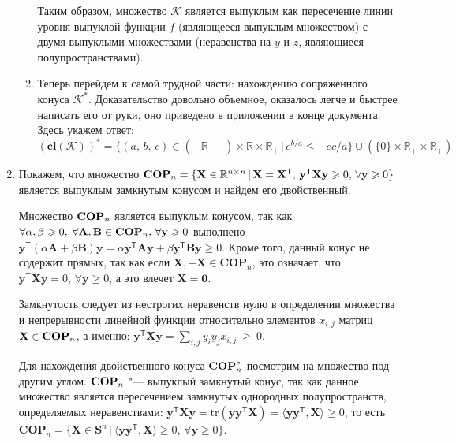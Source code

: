 \documentclass[a4paper,12pt]{article}
\begin{document}
\begin{enumerate}
\begin{enumerate}
			Таким образом, множество $\mathcal{K}$ является выпуклым как пересечение линии уровня выпуклой функции $f$ (являющееся выпуклым множеством) с двумя выпуклыми множествами (неравенства на $y$ и $z$, являющиеся полупространствами).
			
			\item
			
			Теперь перейдем к самой трудной части: нахождению сопряженного конуса $\mathcal{K}^*$. Доказательство довольно объемное, оказалось легче и быстрее написать его от руки, оно приведено в приложении в конце документа. Здесь укажем ответ:
			\begin{equation*}
				(\textbf{cl}(\mathcal{K}))^* = \{ (a,\,b,\,c) \in (-\mathbb{R}_{++}) \times \mathbb{R} \times \mathbb{R}_+ \,|\, e^{b/a} \leqslant -ec/a\} \cup (\{0\} \times \mathbb{R}_+ \times \mathbb{R}_+)
			\end{equation*}
			
		\end{enumerate}
		
		
		
		\item Покажем, что множество $\text{\textbf{COP}}_n = \{ \mathbf{X} \in \mathbb{R}^{n\times n} \,|\, \mathbf{X} = \mathbf{X}^\mathsf{T},\, \mathbf{y}^\mathsf{T} \mathbf{X}\mathbf{y} \geqslant 0,\, \forall \mathbf{y} \geqslant 0\}$ является выпуклым замкнутым конусом и найдем его двойственный.
		
		Множество $\text{\textbf{COP}}_n$ является выпуклым конусом, так как $\forall \alpha, \beta \geqslant 0,\; \forall \mathbf{A}, \mathbf{B} \in \text{\textbf{COP}}_n,\, \forall \mathbf{y} \geqslant 0$ выполнено $ \mathbf{y}^\mathsf{T} (\alpha \mathbf{A} + \beta \mathbf{B}) \mathbf{y} = \alpha \mathbf{y}^\mathsf{T} \mathbf{A}\mathbf{y} + \beta \mathbf{y}^\mathsf{T} \mathbf{B}\mathbf{y} \geqslant 0$. Кроме того, данный конус не содержит прямых, так как если $\mathbf{X}, -\mathbf{X}\in \textbf{COP}_n $, это означает, что $\mathbf{y}^\mathsf{T} \mathbf{X}\mathbf{y} = 0,\, \forall \mathbf{y} \geqslant 0$, а это влечет $\mathbf{X} = \mathbf{0}$.
		
		 Замкнутость следует из нестрогих неравенств нулю в определении множества и непрерывности линейной функции относительно элементов $ x_{i,j}$ матриц $\mathbf{X} \in \text{\textbf{COP}}_n$, а именно: $\mathbf{y}^\mathsf{T} \mathbf{X}\mathbf{y} = \sum_{i,j} y_i y_j x_{i, j}~\geqslant~0$. 
		 
		 Для нахождения двойственного конуса $\text{\textbf{COP}}_n^*$ посмотрим на множество под другим углом. $\text{\textbf{COP}}_n$  "--- выпуклый замкнутый конус, так как данное множество является пересечением замкнутых однородных полупространств, определяемых неравенствами: $\mathbf{y}^\mathsf{T} \mathbf{X}\mathbf{y} = \text{tr}(\mathbf{y} \mathbf{y}^\mathsf{T} \mathbf{X}) = \langle \mathbf{y} \mathbf{y}^\mathsf{T}, \mathbf{X} \rangle \geqslant0 $, то есть $\textbf{COP}_n = \{ \mathbf{X} \in \mathbf{S}^n \,|\ \langle \mathbf{y} \mathbf{y}^\mathsf{T}, \mathbf{X} \rangle \geqslant0,\, \forall \mathbf{y} \geqslant 0\}$. 
		 

\end{enumerate}
\end{document}
